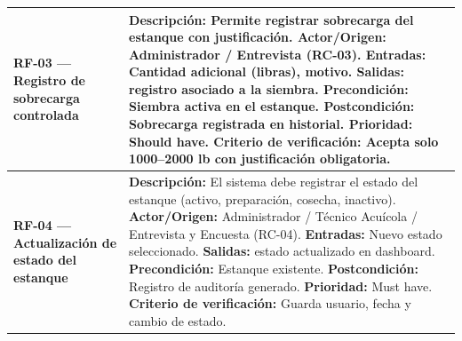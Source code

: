 \documentclass[11pt,a4paper]{article}
\begin{document}
\begin{longtable}{|p{3.5cm}|p{12cm}|}
\textbf{RF-03 — Registro de sobrecarga controlada} &
\textbf{Descripción:} Permite registrar sobrecarga del estanque con justificación. \newline
\textbf{Actor/Origen:} Administrador / Entrevista (RC-03). \newline
\textbf{Entradas:} Cantidad adicional (libras), motivo. \newline
\textbf{Salidas:} registro asociado a la siembra. \newline
\textbf{Precondición:} Siembra activa en el estanque. \newline
\textbf{Postcondición:} Sobrecarga registrada en historial. \newline
\textbf{Prioridad:} Should have. \newline
\textbf{Criterio de verificación:} Acepta solo 1000–2000 lb con justificación obligatoria. \\ \hline

\textbf{RF-04 — Actualización de estado del estanque} &
\textbf{Descripción:} El sistema debe registrar el estado del estanque (activo, preparación, cosecha, inactivo). \newline
\textbf{Actor/Origen:} Administrador / Técnico Acuícola / Entrevista y Encuesta (RC-04). \newline
\textbf{Entradas:} Nuevo estado seleccionado. \newline
\textbf{Salidas:} estado actualizado en dashboard. \newline
\textbf{Precondición:} Estanque existente. \newline
\textbf{Postcondición:} Registro de auditoría generado. \newline
\textbf{Prioridad:} Must have. \newline
\textbf{Criterio de verificación:} Guarda usuario, fecha y cambio de estado. \\ \hline

\end{longtable}
\end{document}
